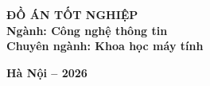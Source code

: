 \documentclass[12pt, a4paper]{report}
\begin{document}
\begin{titlepage}
\begin{minipage}[c][0.97\textheight]{0.78\textwidth}
\begin{center}
            {\fontsize{16pt}{19.2pt}\selectfont \textbf{ĐỒ ÁN TỐT NGHIỆP}}\\[16pt]
            
            {\fontsize{13pt}{15.6pt}\selectfont \textbf{Ngành: Công nghệ thông tin}}\\[6pt]
            {\fontsize{13pt}{15.6pt}\selectfont \textbf{Chuyên ngành: Khoa học máy tính}}\\
            
            \vfill
            
            {\fontsize{14pt}{16.8pt}\selectfont \textbf{Hà Nội -- 2026}}\\[1cm]
        \end{center}
    \end{minipage}
    
    \restoregeometry
\end{titlepage}
\end{document}
